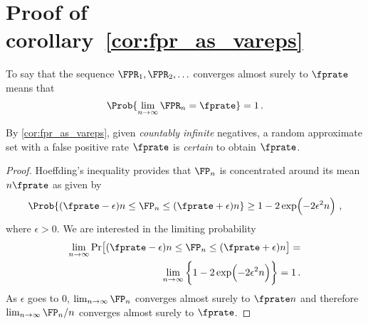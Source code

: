 \documentclass[ ../main.tex]{subfiles}
\begin{document}
	
\appendices
{

\section{Proof of corollary~\ref{cor:fpr_as_vareps}}
\label{app:cor_fpr_as_vareps}
To say that the sequence $\FPR_1,\FPR_2,\ldots$ converges almost surely to $\fprate$ means that
\begin{equation}
\Prob{\lim _{n \to \infty} \FPR_n = \fprate} = 1\,.
\end{equation}

By \cref{cor:fpr_as_vareps}, given \emph{countably infinite} negatives, a random approximate set with a false positive rate $\fprate$ is \emph{certain} to obtain $\fprate$.
\begin{proof}
Hoeffding's inequality\cite{hoeffding} provides that $\FP_n$ is concentrated around its mean $n \fprate$ as given by
\begin{equation}
\Prob{(\fprate -\epsilon) n \leq \FP_n \leq (\fprate + \epsilon )n}
\geq 1 - 2 \exp\!\left(-2\epsilon ^{2} n\right)\,,
\end{equation}
where $\epsilon > 0$.
We are interested in the limiting probability
\begin{equation}
\begin{split}
\lim_{n \to \infty} \Pr\!\left[(\fprate -\epsilon) n \leq 
\FP_n \leq (\fprate + \epsilon)n\right] =\\
\lim_{n \to \infty} \left\{ 1 - 
2 \exp\!\left(-2\epsilon ^{2} n\right) \right\} = 1\,.
\end{split}
\end{equation}
As $\epsilon$ goes to $0$, $\lim_{n \to \infty} \FP_n$ converges almost surely to $\fprate n$ and therefore $\lim_{n \to \infty} \FP_n / n$ converges almost surely to $\fprate$.
\end{proof}

}
\end{document}
